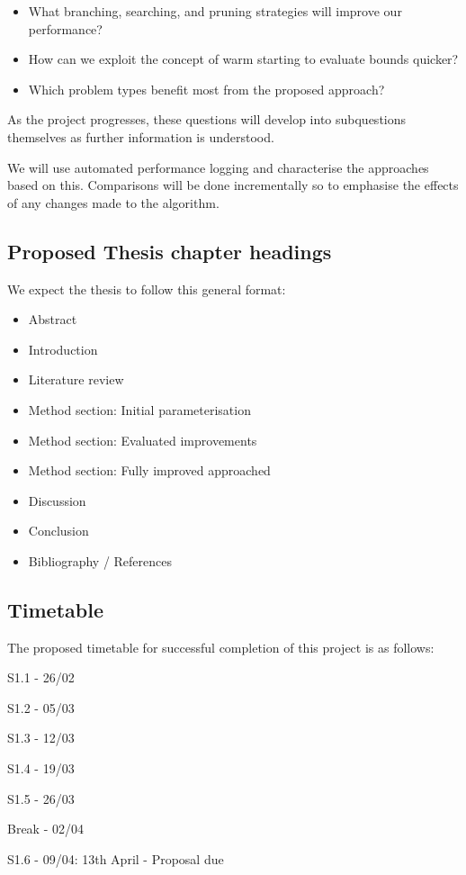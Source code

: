 \documentclass[12pt, a4paper]{article}
\begin{document}
\begin{itemize}
\item What branching, searching, and pruning strategies will improve our performance?
\item How can we exploit the concept of warm starting to evaluate bounds quicker?
\item Which problem types benefit most from the proposed approach?
\end{itemize}

As the project progresses, these questions will develop into subquestions themselves as further information is understood.

We will use automated performance logging and characterise the approaches based on this. Comparisons will be done incrementally so to emphasise the effects of any changes made to the algorithm.

\subsection{Proposed Thesis chapter headings}
We expect the thesis to follow this general format:
\begin{itemize}
  \item Abstract
  \item Introduction
  \item Literature review
  \item Method section: Initial parameterisation
  \item Method section: Evaluated improvements
  \item Method section: Fully improved approached
  \item Discussion
  \item Conclusion
  \item Bibliography / References
\end{itemize}
\subsection{Timetable}
The proposed timetable for successful completion of this project is as follows:

S1.1  - 26/02

S1.2  - 05/03

S1.3  - 12/03

S1.4  - 19/03

S1.5  - 26/03

Break - 02/04

S1.6  - 09/04: 13th April - Proposal due
\end{document}
